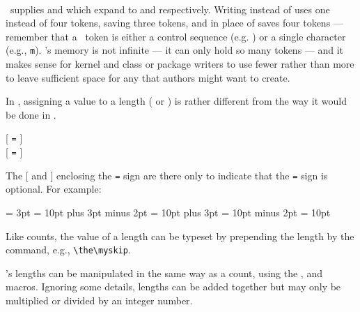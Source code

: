 \begin{syntax}
\cmd{\@plus} \cmd{\@minus} \\
\end{syntax}
\ltx\ supplies \cmd{\@plus} and \cmd{\@minus} which expand to 
and  respectively. Writing \cmd{\@plus} instead of 
uses one instead of four tokens, saving three tokens, 
and \cmd{\@minus} in place of 
saves four tokens --- remember that a \tx\ token is either a control 
sequence (e.g. \cmd{\@minus}) or a single character (e.g., \verb?m?). 
\tx's memory is not infinite --- it can only hold so many tokens --- and
it makes sense for kernel and class or package writers to use fewer 
rather than more to leave sufficient space for any that authors might want
to create.

In \tx, assigning a value to a length (\cmd{\dimen} or \cmd{\skip}) is 
rather different from the way it would be done in \ltx.
\begin{syntax}
 [ \texttt{=} ]  \\
 [ \texttt{=} ]  \\
\end{syntax}
The [ and ] enclosing the \texttt{=} sign are there only
to indicate that the \texttt{=} sign is optional. For example:
\begin{lcode}
\newdimen\mydimen
\mydimen = 3pt    %
\mydimen   -13pt  %
\myskip = 10pt plus 3pt minus 2pt %
\myskip = 10pt plus 3pt           %
\myskip = 10pt minus 2pt          %
\myskip = 10pt                    %
\end{lcode}

    Like counts, the value of a length can be typeset by prepending the 
length by the \cmd{\the} command, e.g., \verb?\the\myskip?.

    \tx's lengths can be manipulated in the same way as a count, using the
\cmd{\advance}, \cmd{\multiply} and \cmd{\divide} macros. Ignoring some 
details, lengths can be added together but may only be multiplied or divided
by an integer number. 


\newdimen\Wdimen \newskip\Wskip

